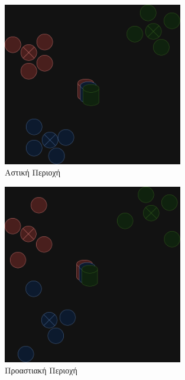 \begin{figure}[H]
    \centering
    \includegraphics[width=0.7\textwidth]{figures/chapter1/urban.drawio.png}
    \caption{Αστική Περιοχή}
    \label{fig47}
\end{figure}

\begin{figure}[H]
    \centering
    \includegraphics[width=0.7\textwidth]{figures/chapter1/suburban.drawio.png}
    \caption{Προαστιακή Περιοχή}
    \label{fig48}
\end{figure}

\newpage

